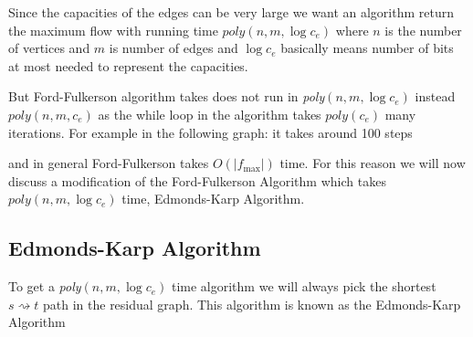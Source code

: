 Since the capacities of the edges can be very large we want an algorithm return the maximum flow with running time $\textit{poly}(n,m,\log c_e)$ where $n$ is the number of vertices and $m$ is number of edges and $\log c_e$ basically means number of bits at most needed to represent the capacities.

But Ford-Fulkerson algorithm takes does not run in \textit{poly}$(n,m,\log c_e)$ instead $\textit{poly}(n,m,c_e)$ as the while loop in the algorithm takes $\textit{poly}(c_e)$ many iterations. For example in the following graph: it takes around 100 steps
\begin{center}
\end{center}
and in general  Ford-Fulkerson takes $O(|f_{\max}|)$ time. For this reason we will now discuss a modification of the Ford-Fulkerson Algorithm which takes $\textit{poly}(n,m,\log c_e)$ time, Edmonds-Karp Algorithm.
\subsection{Edmonds-Karp Algorithm}
To get a \textit{poly}$(n,m,\log c_e)$ time algorithm  we will always pick the shortest $s\rightsquigarrow t$  path in the residual graph. This algorithm is known as the Edmonds-Karp Algorithm

